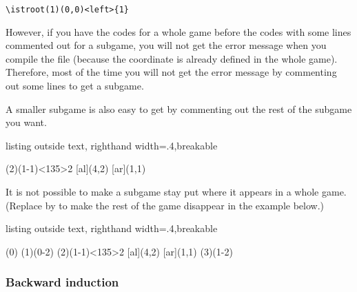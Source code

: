 \verb+\istroot(1)(0,0)<left>{1}+

\noindent
However, if you have the codes for a whole game before the codes with some lines commented out for a subgame, you will not get the error message when you compile the file (because the coordinate  is already defined in the whole game). 
Therefore, most of the time you will not get the error message by commenting out some lines to get a subgame.


A smaller subgame is also easy to get by commenting out the rest of the subgame you want.

\begin{tcblisting}{listing outside text, righthand width=.4\linewidth,breakable}
\begin{istgame}
\xtdistance{10mm}{20mm}
\istroot(2)(1-1)<135>{2}
  \istb{\ell}[al]{(4,2)}
  [ar]{(1,1)}
  \endist 
\end{istgame}
\end{tcblisting}

It is not possible to make a subgame stay put where it appears in a whole game. 
(Replace \xw{[black!5]} by \xw{[white]} to make the rest of the game disappear in the example below.)


\begin{tcblisting}{listing outside text, righthand width=.4\linewidth,breakable}
\begin{istgame}
\setistDecisionNodeStyle[black!5]
\xtdistance{15mm}{30mm}
\istroot[-135](0)%
  \istb[black!5]%
  \istb[black!5]%
  \endist 
\istroot(1)(0-2)%
  \istb[black!5]%
  \istb[black!5]%
  \endist 
\setistDecisionNodeStyle
\xtdistance{10mm}{20mm}
\istroot(2)(1-1)<135>{2}
  \istb{\ell}[al]{(4,2)}
  [ar]{(1,1)}
  \endist 
\setistDecisionNodeStyle[black!5]
\istroot(3)(1-2)%
  \istb[black!5]%
  \istb[black!5]%
  \endist 
\end{istgame}
\end{tcblisting}


\subsubsection{Backward induction}

